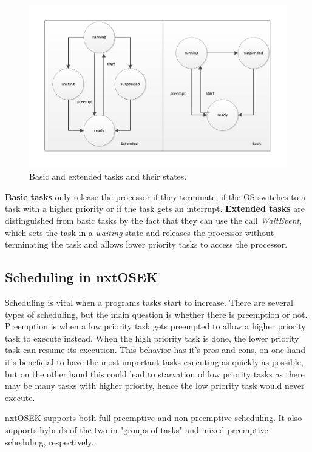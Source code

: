 \begin{figure}[hptb]
  \centering
    \includegraphics[width=1.0\textwidth]{img/taskstate.pdf}
  \caption{Basic and extended tasks and their states.}
  \label{taskstate}
\end{figure}

\textbf{Basic tasks} only release the processor if they terminate, if the OS switches to a task with a higher priority or if the task gets an interrupt.
\textbf{Extended tasks} are distinguished from basic tasks by the fact that they can use the call \emph{WaitEvent}, which sets the task in a \emph{waiting} state and releases the processor without terminating the task and allows lower priority tasks to access the processor.

\subsection{Scheduling in nxtOSEK} %
\label{sub:scheduling_in_nxtosek}
 Scheduling is vital when a programs tasks start to increase. There are several types of scheduling, but the main question is whether there is preemption or not. Preemption is when a low priority task gets preempted to allow a higher priority task to execute instead. When the high priority task is done, the lower priority task can resume its execution. This behavior has it's pros and cons, on one hand it's beneficial to have the most important tasks executing as quickly as possible, but on the other hand this could lead to starvation of low priority tasks as there may be many tasks with higher priority, hence the low priority task would never execute. 

nxtOSEK supports both full preemptive and non preemptive scheduling. It also supports hybrids of the two in "groups of tasks" and mixed preemptive scheduling, respectively.

